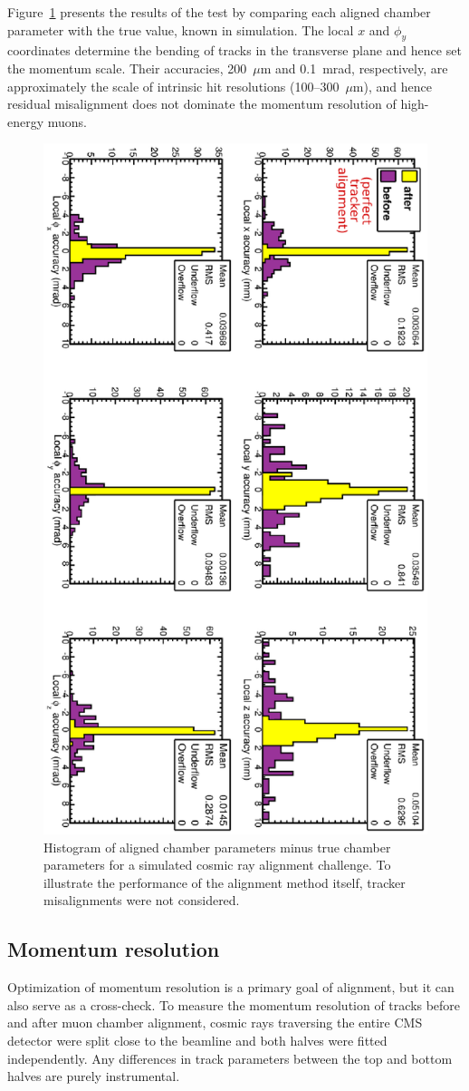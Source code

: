 Figure~\ref{hip_MC_simple2} presents the results of the test by
comparing each aligned chamber parameter with the true value, known in
simulation.  The local $x$ and $\phi_y$ coordinates determine the
bending of tracks in the transverse plane and hence set the momentum
scale.  Their accuracies, 200~$\mu$m and 0.1~mrad, respectively, are
approximately the scale of intrinsic hit resolutions
(100--300~$\mu$m), and hence residual misalignment does not dominate
the momentum resolution of high-energy muons.

\begin{figure}
\centering
\includegraphics[height=\linewidth, angle=90]{hip_MC_simple2.eps}
\caption{Histogram of aligned chamber parameters minus true chamber parameters for a simulated cosmic ray alignment challenge.  To illustrate the performance of the alignment method itself, tracker misalignments were not considered.} \label{hip_MC_simple2}
\end{figure}

\subsection{Momentum resolution}

Optimization of momentum resolution is a primary goal of alignment,
but it can also serve as a cross-check.  To measure the momentum
resolution of tracks before and after muon chamber alignment, cosmic
rays traversing the entire CMS detector were split close to the
beamline and both halves were fitted independently.  Any differences
in track parameters between the top and bottom halves are purely
instrumental.

